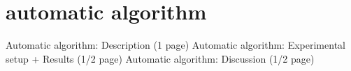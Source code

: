 \section{automatic algorithm}

Automatic algorithm: Description (1 page)
Automatic algorithm: Experimental setup + Results (1/2 page)
Automatic algorithm: Discussion (1/2 page)
